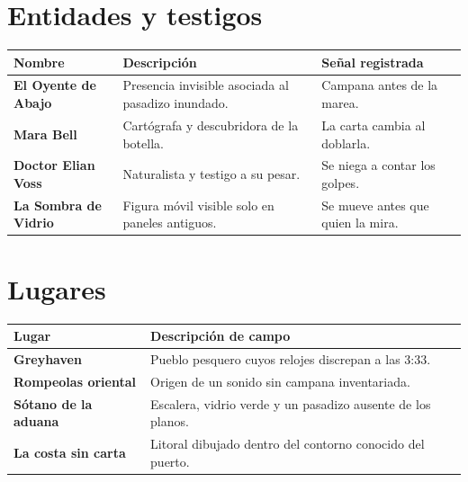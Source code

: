 \section*{Entidades y testigos}
\begin{tabularx}{\textwidth}{>{\bfseries}p{} X X}
\toprule
Nombre & Descripción & Señal registrada \\
\midrule
El Oyente de Abajo & Presencia invisible asociada al pasadizo inundado. & Campana antes de la marea. \\
Mara Bell & Cartógrafa y descubridora de la botella. & La carta cambia al doblarla. \\
Doctor Elian Voss & Naturalista y testigo a su pesar. & Se niega a contar los golpes. \\
La Sombra de Vidrio & Figura móvil visible solo en paneles antiguos. & Se mueve antes que quien la mira. \\
\bottomrule
\end{tabularx}

\section*{Lugares}
\begin{tabularx}{\textwidth}{>{\bfseries}p{} X}
\toprule
Lugar & Descripción de campo \\
\midrule
Greyhaven & Pueblo pesquero cuyos relojes discrepan a las 3:33. \\
Rompeolas oriental & Origen de un sonido sin campana inventariada. \\
Sótano de la aduana & Escalera, vidrio verde y un pasadizo ausente de los planos. \\
La costa sin carta & Litoral dibujado dentro del contorno conocido del puerto. \\
\bottomrule
\end{tabularx}
